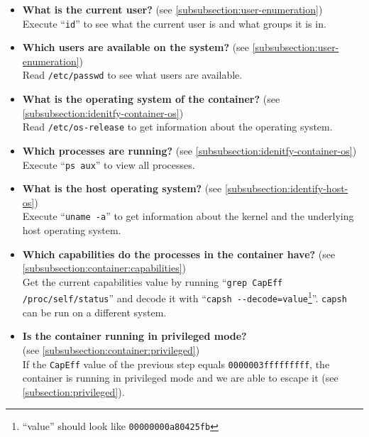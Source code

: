 \begin{itemize}
    \item \textbf{What is the current user?} (see \autoref{subsubsection:user-enumeration})\\
    Execute ``\lstinline{id}'' to see what the current user is and what groups it is in.

    \item \textbf{Which users are available on the system?} (see \autoref{subsubsection:user-enumeration})\\
    Read \lstinline{/etc/passwd} to see what users are available.

    \item \textbf{What is the operating system of the container?} (see \autoref{subsubsection:idenitfy-container-os})\\
    Read \lstinline{/etc/os-release} to get information about the operating system.

    \item \textbf{Which processes are running?} (see \autoref{subsubsection:idenitfy-container-os})\\
    Execute ``\lstinline{ps aux}'' to view all processes.

    \item \textbf{What is the host operating system?} (see \autoref{subsubsection:identify-host-os})\\
    Execute ``\lstinline{uname -a}'' to get information about the kernel and the underlying host operating system.

    \item \textbf{Which capabilities do the processes in the container have?} (see \autoref{subsubsection:container:capabilities})\\
    Get the current capabilities value by running ``\lstinline{grep CapEff /proc/self/status}'' and decode it with ``\lstinline{capsh --decode=value}\footnote{``value'' should look like \lstinline{00000000a80425fb}}''. \lstinline{capsh} can be run on a different system.

    \item \textbf{Is the container running in privileged mode?} 
    \\(see \autoref{subsubsection:container:privileged})\\
    If the \lstinline{CapEff} value of the previous step equals \lstinline{0000003fffffffff}, the container is running in privileged mode and we are able to escape it (see \autoref{subsection:privileged}).


\end{itemize}
